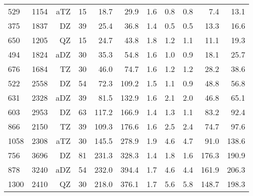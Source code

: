 \begin{table}[H]
\begin{tabular}{lrrrrrrrrrr}
 529& 1154&   aTZ&    15&                18.7 &               29.9&     1.6 &                0.8 &                0.8&                 7.4&                13.1\\
 375& 1837&    DZ&    39&                25.4 &               36.8&     1.4 &                0.5 &                0.5&                13.3&                16.6\\
 650& 1205&    QZ&    15&                24.7 &               43.8&     1.8 &                1.2 &                1.1&                11.1&                19.3\\
 494& 1824&   aDZ&    30&                35.3 &               54.8&     1.6 &                1.0 &                0.9&                18.1&                25.7\\
 676& 1684&    TZ&    30&                46.0 &               74.7&     1.6 &                1.2 &                1.2&                28.2&                38.6\\
 522& 2558&    DZ&    54&                72.3 &              109.2&     1.5 &                1.1 &                0.9&                48.8&                56.8\\
 631& 2328&   aDZ&    39&                81.5 &              132.9&     1.6 &                2.1 &                2.0&                46.8&                65.1\\
 603& 2953&    DZ&    63&               117.2 &              166.9&     1.4 &                1.3 &                1.1&                83.2&                92.4\\
 866& 2150&    TZ&    39&               109.3 &              176.6&     1.6 &                2.5 &                2.4&                74.7&                97.6\\
1058& 2308&   aTZ&    30&               145.5 &              278.9&     1.9 &                4.6 &                4.7&                91.0&               138.6\\
 756& 3696&    DZ&    81&               231.3 &              328.3&     1.4 &                1.8 &                1.6&               176.3&               190.9\\
 878& 3240&   aDZ&    54&               232.0 &              394.4&     1.7 &                4.6 &                4.4&               161.9&               206.3\\
1300& 2410&    QZ&    30&               218.0 &              376.1&     1.7 &                5.6 &                5.8&               148.7&               198.3\\

\end{tabular}
\end{table}
